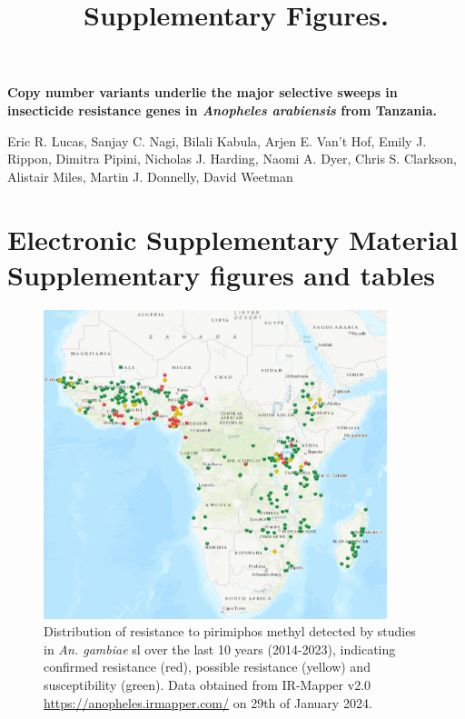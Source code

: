 \documentclass[a4paper,12pt]{article}
\title{Supplementary Figures.}
\begin{document}
\onehalfspacing

\begin{center}
	\Large
	\noindent \textbf{Copy number variants underlie the major selective sweeps in insecticide resistance genes in \textit{Anopheles arabiensis} from Tanzania.}

	\normalsize

	\vskip 3cm

\end{center}

\noindent Eric R. Lucas, Sanjay C. Nagi, Bilali Kabula, Arjen E. Van’t Hof, Emily J. Rippon, Dimitra Pipini, Nicholas J. Harding, Naomi A. Dyer, Chris S. Clarkson, Alistair Miles, Martin J. Donnelly, David Weetman
 

 
\vskip 2cm 


\section*{Electronic Supplementary Material \\ Supplementary figures and tables}

\clearpage


\begin{figure}[h]
	\begin{center}
	\vskip 7cm
	\includegraphics*[width = 10cm]{./Anopheles_PM_resistance_map.png}
	\caption{\footnotesize Distribution of resistance to pirimiphos methyl detected by studies in \textit{An. gambiae} sl over the last 10 years (2014-2023), indicating confirmed resistance (red), possible resistance (yellow) and susceptibility (green). Data obtained from IR-Mapper v2.0 \url{https://anopheles.irmapper.com/} on 29th of January 2024.}
	\end{center}
	\label{FigS1}
\end{figure}
\end{document}

